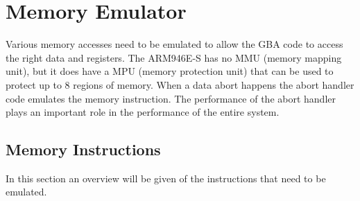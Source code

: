 \documentclass[a4paper,10pt]{report}
\begin{document}
\chapter{Memory Emulator}\label{chap_mememu}
	Various memory accesses need to be emulated to allow the GBA code to access the right data and registers. The ARM946E-S has no MMU (memory mapping unit), but it does have a MPU (memory protection unit) that can be used to protect up to 8 regions of memory. When a data abort happens the abort handler code emulates the memory instruction. The performance of the abort handler plays an important role in the performance of the entire system.
	\section{Memory Instructions}
	In this section an overview will be given of the instructions that need to be emulated.
\end{document}
